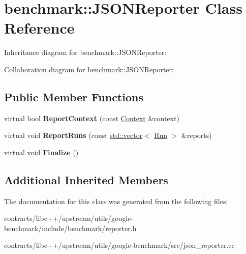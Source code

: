 \hypertarget{classbenchmark_1_1_j_s_o_n_reporter}{}\section{benchmark\+:\+:J\+S\+O\+N\+Reporter Class Reference}
\label{classbenchmark_1_1_j_s_o_n_reporter}


Inheritance diagram for benchmark\+:\+:J\+S\+O\+N\+Reporter\+:


Collaboration diagram for benchmark\+:\+:J\+S\+O\+N\+Reporter\+:
\subsection*{Public Member Functions}
\begin{DoxyCompactItemize}
\item 
\mbox{\label{classbenchmark_1_1_j_s_o_n_reporter_a4e20dafa3f853d6a395d9efe07f89582}} 
virtual bool {\bfseries Report\+Context} (const \mbox{\hyperlink{structbenchmark_1_1_benchmark_reporter_1_1_context}{Context}} \&context)
\item 
\mbox{\label{classbenchmark_1_1_j_s_o_n_reporter_a3717099013aa4920dc9b408bcbe9b6a6}} 
virtual void {\bfseries Report\+Runs} (const \mbox{\hyperlink{classstd_1_1vector}{std\+::vector}}$<$ \mbox{\hyperlink{structbenchmark_1_1_benchmark_reporter_1_1_run}{Run}} $>$ \&reports)
\item 
\mbox{\label{classbenchmark_1_1_j_s_o_n_reporter_a2307769e375d65bf93051b2a8c8c2e9d}} 
virtual void {\bfseries Finalize} ()
\end{DoxyCompactItemize}
\subsection*{Additional Inherited Members}


The documentation for this class was generated from the following files\+:\begin{DoxyCompactItemize}
\item 
contracts/libc++/upstream/utils/google-\/benchmark/include/benchmark/reporter.\+h\item 
contracts/libc++/upstream/utils/google-\/benchmark/src/json\+\_\+reporter.\+cc\end{DoxyCompactItemize}
